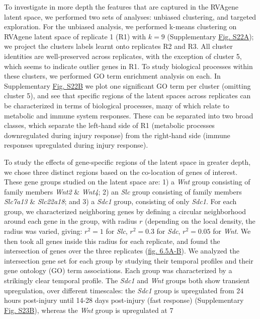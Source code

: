 {
  To investigate in more depth the features that are captured in the RVAgene latent space, we performed two sets of analyses: unbiased clustering, and targeted exploration. For the unbiased analysis, we performed k-means clustering on RVAgene latent space of replicate 1 (R1) with $k=9$ (Supplementary \hyperref[fig:figS7]{Fig. S22A}); we project the clusters labels learnt onto replicates R2 and R3. All cluster identities are well-preserved across replicates, with the exception of cluster 5, which seems to indicate outlier genes in R1. To study biological processes within these clusters, we performed GO term enrichment analysis on each. In Supplementary  \hyperref[fig:figS7]{Fig. S22B} we plot one significant GO term per cluster (omitting cluster 5), and see that specific regions of the latent spaces across replicates can be characterized in terms of biological processes, many of which relate to metabolic and immune system responses. These can be separated into two broad classes, which separate the left-hand side of R1 (metabolic processes downregulated during injury response) from the right-hand side (immune responses upregulated during injury response). 
}
\par 
To study the effects of gene-specific regions of the latent space in greater depth, we chose three
distinct regions based on the co-location of genes of interest. These gene groups studied on the
latent space are: 1) a {\em Wnt} group consisting of family members {\em Wnt2} \& {\em Wnt4}; 2) an
{\em Slc} group consisting of family members {\em Slc7a13} \& {\em Slc22a18}; and 3) a {\em Sdc1}
group, consisting of only {\em Sdc1}. For each group, we characterized neighboring genes by defining
a circular neighborhood around each gene in the group, with radius $r$ (depending on the local
density, the radius was varied, giving: $r^2 = 1$ for {\em Slc}, $r^2 = 0.3$ for {\em Sdc}, $r^2 =
0.05$ for {\em Wnt}. We then took all genes inside this radius for each replicate, and found the
intersection of genes over the three replicates (\hyperref[fig:fig6b]{fig. 6.5A-B}). We analyzed the
intersection gene set for each group by studying their temporal profiles and their gene ontology
(GO) term associations. Each group was characterized by a strikingly clear temporal profile. The
{\em Sdc1} and {\em Wnt} groups both show transient upregulation, over different timescales: the
{\em Sdc1} group is upregulated from 24 hours post-injury until 14-28 days post-injury (fast
response) (Supplementary \hyperref[fig:figS8]{Fig. S23B}), whereas the {\em Wnt} group is upregulated at 7
